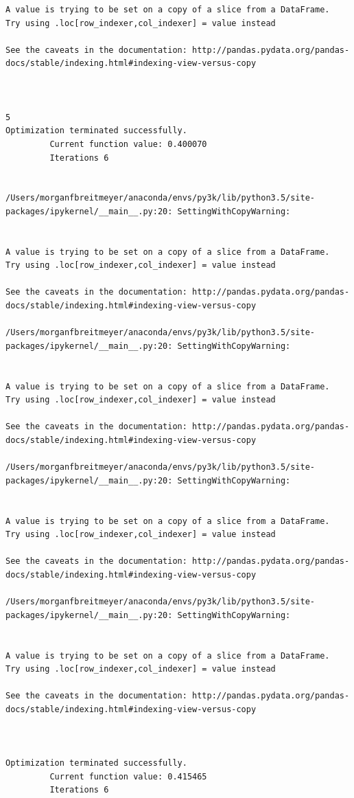 \begin{lstlisting}
A value is trying to be set on a copy of a slice from a DataFrame.
Try using .loc[row_indexer,col_indexer] = value instead

See the caveats in the documentation: http://pandas.pydata.org/pandas-docs/stable/indexing.html#indexing-view-versus-copy



5
Optimization terminated successfully.
         Current function value: 0.400070
         Iterations 6


/Users/morganfbreitmeyer/anaconda/envs/py3k/lib/python3.5/site-packages/ipykernel/__main__.py:20: SettingWithCopyWarning:


A value is trying to be set on a copy of a slice from a DataFrame.
Try using .loc[row_indexer,col_indexer] = value instead

See the caveats in the documentation: http://pandas.pydata.org/pandas-docs/stable/indexing.html#indexing-view-versus-copy

/Users/morganfbreitmeyer/anaconda/envs/py3k/lib/python3.5/site-packages/ipykernel/__main__.py:20: SettingWithCopyWarning:


A value is trying to be set on a copy of a slice from a DataFrame.
Try using .loc[row_indexer,col_indexer] = value instead

See the caveats in the documentation: http://pandas.pydata.org/pandas-docs/stable/indexing.html#indexing-view-versus-copy

/Users/morganfbreitmeyer/anaconda/envs/py3k/lib/python3.5/site-packages/ipykernel/__main__.py:20: SettingWithCopyWarning:


A value is trying to be set on a copy of a slice from a DataFrame.
Try using .loc[row_indexer,col_indexer] = value instead

See the caveats in the documentation: http://pandas.pydata.org/pandas-docs/stable/indexing.html#indexing-view-versus-copy

/Users/morganfbreitmeyer/anaconda/envs/py3k/lib/python3.5/site-packages/ipykernel/__main__.py:20: SettingWithCopyWarning:


A value is trying to be set on a copy of a slice from a DataFrame.
Try using .loc[row_indexer,col_indexer] = value instead

See the caveats in the documentation: http://pandas.pydata.org/pandas-docs/stable/indexing.html#indexing-view-versus-copy



Optimization terminated successfully.
         Current function value: 0.415465
         Iterations 6



\end{lstlisting}
